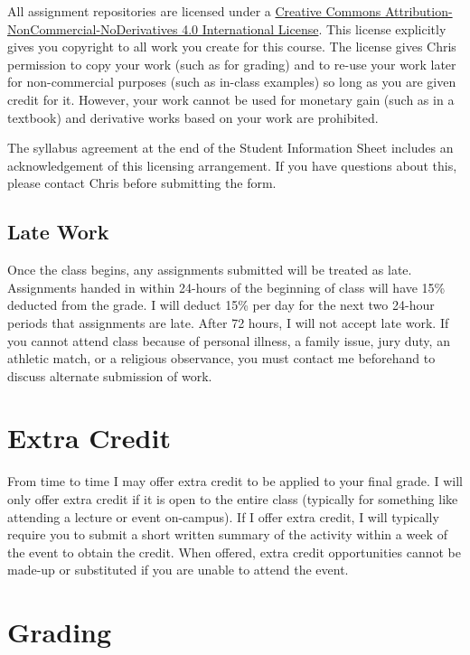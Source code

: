 \documentclass[
]{book}
\begin{document}
All assignment repositories are licensed under a \href{https://creativecommons.org/licenses/by-nc-nd/4.0/}{Creative Commons Attribution-NonCommercial-NoDerivatives 4.0 International License}. This license explicitly gives you copyright to all work you create for this course. The license gives Chris permission to copy your work (such as for grading) and to re-use your work later for non-commercial purposes (such as in-class examples) so long as you are given credit for it. However, your work cannot be used for monetary gain (such as in a textbook) and derivative works based on your work are prohibited.

The syllabus agreement at the end of the Student Information Sheet includes an acknowledgement of this licensing arrangement. If you have questions about this, please contact Chris before submitting the form.

\hypertarget{late-work}{%
\subsection{Late Work}\label{late-work}}

Once the class begins, any assignments submitted will be treated as late. Assignments handed in within 24-hours of the beginning of class will have 15\% deducted from the grade. I will deduct 15\% per day for the next two 24-hour periods that assignments are late. After 72 hours, I will not accept late work. If you cannot attend class because of personal illness, a family issue, jury duty, an athletic match, or a religious observance, you must contact me beforehand to discuss alternate submission of work.

\hypertarget{extra-credit}{%
\section{Extra Credit}\label{extra-credit}}

From time to time I may offer extra credit to be applied to your final grade. I will only offer extra credit if it is open to the entire class (typically for something like attending a lecture or event on-campus). If I offer extra credit, I will typically require you to submit a short written summary of the activity within a week of the event to obtain the credit. When offered, extra credit opportunities cannot be made-up or substituted if you are unable to attend the event.

\hypertarget{grading}{%
\section{Grading}\label{grading}}
\end{document}
